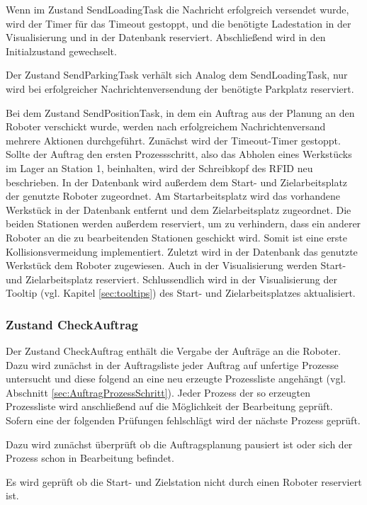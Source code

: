 Wenn im Zustand SendLoadingTask die Nachricht erfolgreich versendet wurde, wird der Timer für das Timeout gestoppt, und die benötigte Ladestation in der Visualisierung und in der Datenbank reserviert. Abschließend wird in den Initialzustand gewechselt.

Der Zustand SendParkingTask verhält sich Analog dem SendLoadingTask, nur wird bei erfolgreicher Nachrichtenversendung der benötigte Parkplatz reserviert.

Bei dem Zustand SendPositionTask, in dem ein Auftrag aus der Planung an den Roboter verschickt wurde, werden nach erfolgreichem Nachrichtenversand mehrere Aktionen durchgeführt. Zunächst wird der Timeout-Timer gestoppt. Sollte der Auftrag den ersten Prozessschritt, also das Abholen eines Werkstücks im Lager an Station 1, beinhalten, wird der Schreibkopf des RFID neu beschrieben. In der Datenbank wird außerdem dem Start- und Zielarbeitsplatz der genutzte Roboter zugeordnet. Am Startarbeitsplatz wird das vorhandene Werkstück in der Datenbank entfernt und dem Zielarbeitsplatz zugeordnet. Die beiden Stationen werden außerdem reserviert, um zu verhindern, dass ein anderer Roboter an die zu bearbeitenden Stationen geschickt wird. Somit ist eine erste Kollisionsvermeidung implementiert. Zuletzt wird in der Datenbank das genutzte Werkstück dem Roboter zugewiesen. Auch in der Visualisierung werden Start- und Zielarbeitsplatz reserviert. Schlussendlich wird in der Visualisierung der Tooltip (vgl. Kapitel \ref{sec:tooltips}) des Start- und Zielarbeitsplatzes aktualisiert.

\subsubsection{Zustand CheckAuftrag}
\label{sec:CheckAuftrag}

Der Zustand CheckAuftrag enthält die Vergabe der Aufträge an die Roboter. 
Dazu wird zunächst in der Auftragsliste jeder Auftrag auf unfertige Prozesse untersucht und diese folgend an eine neu erzeugte Prozessliste angehängt (vgl. Abschnitt \ref{sec:AuftragProzessSchritt}). Jeder Prozess der so erzeugten Prozessliste wird anschließend auf die Möglichkeit der Bearbeitung geprüft. Sofern eine der folgenden Prüfungen fehlschlägt wird der nächste Prozess geprüft.

Dazu wird zunächst überprüft ob die Auftragsplanung pausiert ist oder sich der Prozess schon in Bearbeitung befindet. 

Es wird geprüft ob die Start- und Zielstation nicht durch einen Roboter reserviert ist.

